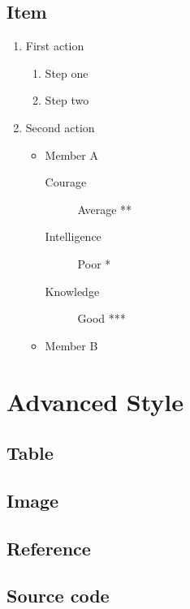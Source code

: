\documentclass{article}
\begin{document}
\subsection{Item}
\begin{enumerate}
  \item First action
  \begin{enumerate}
    \item Step one
    \item Step two
  \end{enumerate}
  \item Second action
  \begin{itemize}
    \item Member A
    \begin{description}
      \item[Courage] Average **
      \item[Intelligence] Poor *
      \item[Knowledge] Good ***
    \end{description}
    \item Member B
  \end{itemize}
\end{enumerate}

\section{Advanced Style}
\subsection{Table}
\subsection{Image}
\subsection{Reference}
\subsection{Source code}
\end{document}
